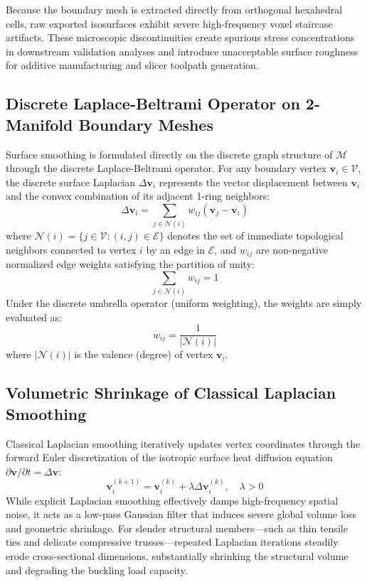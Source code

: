 \documentclass[11pt, a4paper]{article}
\begin{document}
Because the boundary mesh is extracted directly from orthogonal hexahedral cells, raw exported isosurfaces exhibit severe high-frequency voxel staircase artifacts. These microscopic discontinuities create spurious stress concentrations in downstream validation analyses and introduce unacceptable surface roughness for additive manufacturing and slicer toolpath generation.

\subsection{Discrete Laplace-Beltrami Operator on 2-Manifold Boundary Meshes}
Surface smoothing is formulated directly on the discrete graph structure of $\mathcal{M}$ through the discrete Laplace-Beltrami operator. For any boundary vertex $\mathbf{v}_i \in \mathcal{V}$, the discrete surface Laplacian $\Delta \mathbf{v}_i$ represents the vector displacement between $\mathbf{v}_i$ and the convex combination of its adjacent 1-ring neighbors:
\begin{equation}
\Delta \mathbf{v}_i = \sum_{j \in \mathcal{N}(i)} w_{ij} (\mathbf{v}_j - \mathbf{v}_i)
\end{equation}
where $\mathcal{N}(i) = \{j \in \mathcal{V} : (i, j) \in \mathcal{E}\}$ denotes the set of immediate topological neighbors connected to vertex $i$ by an edge in $\mathcal{E}$, and $w_{ij}$ are non-negative normalized edge weights satisfying the partition of unity:
\begin{equation}
\sum_{j \in \mathcal{N}(i)} w_{ij} = 1
\end{equation}
Under the discrete umbrella operator (uniform weighting), the weights are simply evaluated as:
\begin{equation}
w_{ij} = \frac{1}{|\mathcal{N}(i)|}
\end{equation}
where $|\mathcal{N}(i)|$ is the valence (degree) of vertex $\mathbf{v}_i$.

\subsection{Volumetric Shrinkage of Classical Laplacian Smoothing}
Classical Laplacian smoothing iteratively updates vertex coordinates through the forward Euler discretization of the isotropic surface heat diffusion equation $\partial \mathbf{v} / \partial t = \Delta \mathbf{v}$:
\begin{equation}
\mathbf{v}_i^{(k+1)} = \mathbf{v}_i^{(k)} + \lambda \Delta \mathbf{v}_i^{(k)}, \quad \lambda > 0
\end{equation}
While explicit Laplacian smoothing effectively damps high-frequency spatial noise, it acts as a low-pass Gaussian filter that induces severe global volume loss and geometric shrinkage. For slender structural members—such as thin tensile ties and delicate compressive trusses—repeated Laplacian iterations steadily erode cross-sectional dimensions, substantially shrinking the structural volume and degrading the buckling load capacity.
\end{document}
